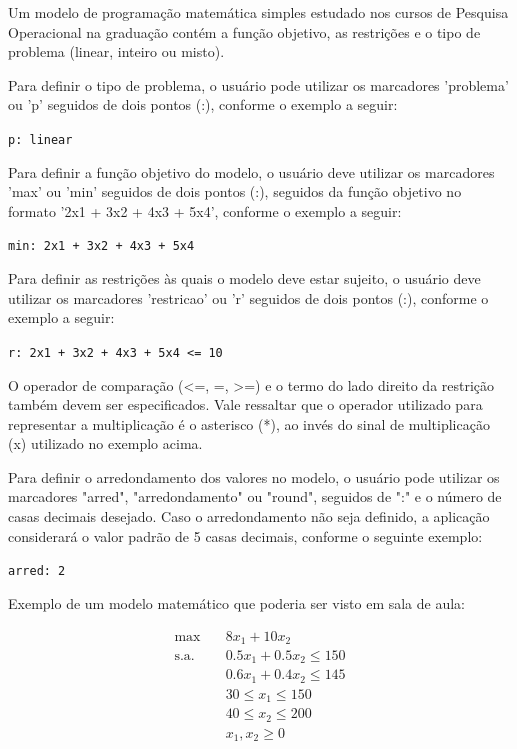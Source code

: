 \documentclass{article}
\begin{document}
Um modelo de programação matemática simples estudado nos cursos de Pesquisa Operacional na graduação contém a função objetivo, as restrições e o tipo de problema (linear, inteiro ou misto).

Para definir o tipo de problema, o usuário pode utilizar os marcadores 'problema' ou 'p' seguidos de dois pontos (:), conforme o exemplo a seguir:

\begin{center}
\texttt{p: linear}
\end{center}

Para definir a função objetivo do modelo, o usuário deve utilizar os marcadores 'max' ou 'min' seguidos de dois pontos (:), seguidos da função objetivo no formato '2x1 + 3x2 + 4x3 + 5x4', conforme o exemplo a seguir:

\begin{center}
\texttt{min: 2x1 + 3x2 + 4x3 + 5x4}
\end{center}

Para definir as restrições às quais o modelo deve estar sujeito, o usuário deve utilizar os marcadores 'restricao' ou 'r' seguidos de dois pontos (:), conforme o exemplo a seguir:

\begin{center}
\texttt{r: 2x1 + 3x2 + 4x3 + 5x4 <= 10}
\end{center}

O operador de comparação (<=, =, >=) e o termo do lado direito da restrição também devem ser especificados. Vale ressaltar que o operador utilizado para representar a multiplicação é o asterisco (*), ao invés do sinal de multiplicação (x) utilizado no exemplo acima.

Para definir o arredondamento dos valores no modelo, o usuário pode utilizar os marcadores "arred", "arredondamento" ou "round", seguidos de ":" e o número de casas decimais desejado. Caso o arredondamento não seja definido, a aplicação considerará o valor padrão de 5 casas decimais, conforme o seguinte exemplo:

\begin{center}
\texttt{arred: 2}
\end{center}

Exemplo de um modelo matemático que poderia ser visto em sala de aula:

\begin{equation*}
\begin{aligned}
\max \quad & 8x_1 + 10x_2 \\
\text{s.a.} \quad & 0.5x_1 + 0.5x_2 \leq 150 \\
& 0.6x_1 + 0.4x_2 \leq 145 \\
& 30 \leq x_1 \leq 150 \\
& 40 \leq x_2 \leq 200 \\
& x_1, x_2 \geq 0
\end{aligned}
\end{equation*}
\end{document}

